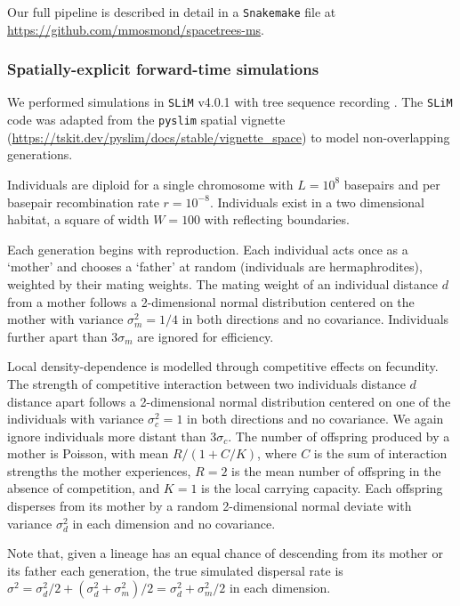 \documentclass[12pt]{article}
\begin{document}
Our full pipeline is described in detail in a \texttt{Snakemake} \citep{molder2021sustainable} file at \url{https://github.com/mmosmond/spacetrees-ms}.

\subsubsection*{Spatially-explicit forward-time simulations}

We performed simulations in \texttt{SLiM} v4.0.1 \citep{haller2023slim} with tree sequence recording \citep{haller2019tree}.
The \texttt{SLiM} code was adapted from the \texttt{pyslim} spatial vignette (\url{https://tskit.dev/pyslim/docs/stable/vignette_space}) to model non-overlapping generations. 

Individuals are diploid for a single chromosome with $L=10^8$ basepairs and per basepair recombination rate $r=10^{-8}$.
Individuals exist in a two dimensional habitat, a square of width $W=100$ with reflecting boundaries.

Each generation begins with reproduction.
Each individual acts once as a `mother' and chooses a `father' at random (individuals are hermaphrodites), weighted by their mating weights.
The mating weight of an individual distance $d$ from a mother follows a 2-dimensional normal distribution centered on the mother with variance $\sigma_m^2=1/4$ in both directions and no covariance.
Individuals further apart than $3\sigma_m$ are ignored for efficiency.

Local density-dependence is modelled through competitive effects on fecundity.
The strength of competitive interaction between two individuals distance $d$ distance apart follows a 2-dimensional normal distribution centered on one of the individuals with variance $\sigma_c^2=1$ in both directions and no covariance.
We again ignore individuals more distant than $3\sigma_c$.
The number of offspring produced by a mother is Poisson, with mean $R/(1 + C/K)$, where $C$ is the sum of interaction strengths the mother experiences, $R=2$ is the mean number of offspring in the absence of competition, and $K=1$ is the local carrying capacity. 
Each offspring disperses from its mother by a random 2-dimensional normal deviate with variance $\sigma_d^2$ in each dimension and no covariance. 

Note that, given a lineage has an equal chance of descending from its mother or its father each generation, the true simulated dispersal rate is $\sigma^2 = \sigma_d^2/2 + (\sigma_d^2 + \sigma_m^2)/2 = \sigma_d^2 + \sigma_m^2/2$ \citep{smith2023dispersal} in each dimension.
\end{document}
